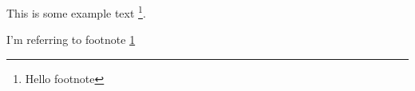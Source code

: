 \documentclass{article}
\begin{document}
	This is some example text \footnote{{\label{myfootnote}Hello footnote}}.
	
	I'm referring to footnote \ref{myfootnote}
\end{document}
